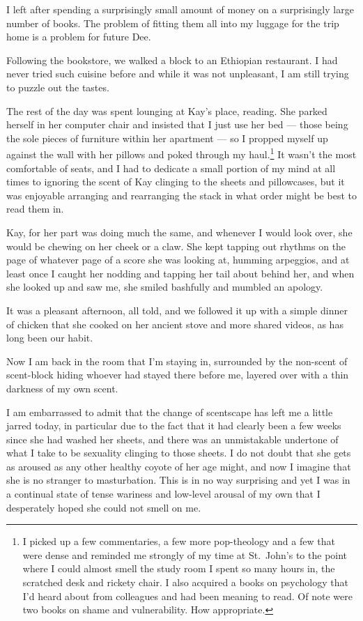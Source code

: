 I left after spending a surprisingly small amount of money on a surprisingly large number of books. The problem of fitting them all into my luggage for the trip home is a problem for future Dee.

Following the bookstore, we walked a block to an Ethiopian restaurant. I had never tried such cuisine before and while it was not unpleasant, I am still trying to puzzle out the tastes.

The rest of the day was spent lounging at Kay's place, reading. She parked herself in her computer chair and insisted that I just use her bed --- those being the sole pieces of furniture within her apartment --- so I propped myself up against the wall with her pillows and poked through my haul.\footnote{I picked up a few commentaries, a few more pop-theology and a few that were dense and reminded me strongly of my time at St.~John's to the point where I could almost smell the study room I spent so many hours in, the scratched desk and rickety chair. I also acquired a books on psychology that I'd heard about from colleagues and had been meaning to read. Of note were two books on shame and vulnerability. How appropriate.} It wasn't the most comfortable of seats, and I had to dedicate a small portion of my mind at all times to ignoring the scent of Kay clinging to the sheets and pillowcases, but it was enjoyable arranging and rearranging the stack in what order might be best to read them in.

Kay, for her part was doing much the same, and whenever I would look over, she would be chewing on her cheek or a claw. She kept tapping out rhythms on the page of whatever page of a score she was looking at, humming arpeggios, and at least once I caught her nodding and tapping her tail about behind her, and when she looked up and saw me, she smiled bashfully and mumbled an apology.

It was a pleasant afternoon, all told, and we followed it up with a simple dinner of chicken that she cooked on her ancient stove and more shared videos, as has long been our habit.

Now I am back in the room that I'm staying in, surrounded by the non-scent of scent-block hiding whoever had stayed there before me, layered over with a thin darkness of my own scent.

I am embarrassed to admit that the change of scentscape has left me a little jarred today, in particular due to the fact that it had clearly been a few weeks since she had washed her sheets, and there was an unmistakable undertone of what I take to be sexuality clinging to those sheets. I do not doubt that she gets as aroused as any other healthy coyote of her age might, and now I imagine that she is no stranger to masturbation. This is in no way surprising and yet I was in a continual state of tense wariness and low-level arousal of my own that I desperately hoped she could not smell on me.

